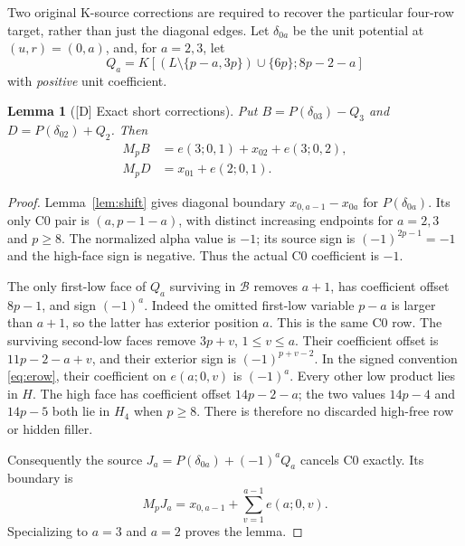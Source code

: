 \documentclass[11pt]{article}
\newtheorem{lemma}[theorem]{Lemma}
\theoremstyle{definition}
\theoremstyle{remark}
\begin{document}
Two original K-source corrections are required to recover the particular
four-row target, rather than just the diagonal edges. Let $\delta_{0a}$
be the unit potential at $(u,r)=(0,a)$, and, for $a=2,3$, let
\begin{equation}\label{eq:Qa}
 Q_a=K[(L\setminus\{p-a,3p\})\cup\{6p\};8p-2-a]
\end{equation}
with \emph{positive} unit coefficient.

\begin{lemma}[{[D]} Exact short corrections]\label{lem:corrections}
Put $B=P(\delta_{03})-Q_3$ and $D=P(\delta_{02})+Q_2$. Then
\begin{align}
 M_pB&=e(3;0,1)+x_{02}+e(3;0,2),\label{eq:Bboundary}\\
 M_pD&=x_{01}+e(2;0,1).\label{eq:Dboundary}
\end{align}
\end{lemma}
\begin{proof}
Lemma~\ref{lem:shift} gives diagonal boundary
$x_{0,a-1}-x_{0a}$ for $P(\delta_{0a})$.
Its only C0 pair is $(a,p-1-a)$, with distinct increasing endpoints
for $a=2,3$ and $p\geq8$. The normalized alpha value is $-1$;
its source sign is $(-1)^{2p-1}=-1$ and the high-face sign is negative.
Thus the actual C0 coefficient is $-1$.

The only first-low face of $Q_a$ surviving in $\mathcal B$ removes
$a+1$, has coefficient offset $8p-1$, and sign $(-1)^a$.
Indeed the omitted first-low variable $p-a$ is larger than $a+1$,
so the latter has exterior position $a$. This is the same C0 row.
The surviving second-low faces remove $3p+v$, $1\leq v\leq a$.
Their coefficient offset is $11p-2-a+v$, and their exterior sign is
$(-1)^{p+v-2}$. In the signed convention \eqref{eq:erow}, their
coefficient on $e(a;0,v)$ is $(-1)^a$. Every other low product lies
in $H$. The high face has coefficient offset $14p-2-a$; the two
values $14p-4$ and $14p-5$ both lie in $H_4$ when $p\geq8$.
There is therefore no discarded high-free row or hidden filler.

Consequently the source $J_a=P(\delta_{0a})+(-1)^aQ_a$ cancels C0 exactly.
Its boundary is
\[
 M_pJ_a=x_{0,a-1}+\sum_{v=1}^{a-1}e(a;0,v).
\]
Specializing to $a=3$ and $a=2$ proves the lemma.
\end{proof}
\end{document}
